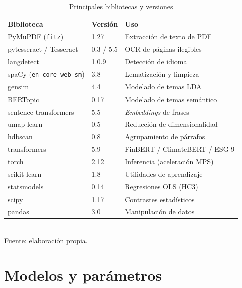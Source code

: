 \begin{table}[H]
\centering
\caption{Principales bibliotecas y versiones}
\label{tab:versiones}
\begin{tabular}{lll}
\toprule
\textbf{Biblioteca} & \textbf{Versión} & \textbf{Uso} \\
\midrule
PyMuPDF (\texttt{fitz}) & 1.27 & Extracción de texto de PDF \\
pytesseract / Tesseract & 0.3 / 5.5 & OCR de páginas ilegibles \\
langdetect & 1.0.9 & Detección de idioma \\
spaCy (\texttt{en\_core\_web\_sm}) & 3.8 & Lematización y limpieza \\
gensim & 4.4 & Modelado de temas LDA \\
BERTopic & 0.17 & Modelado de temas semántico \\
sentence-transformers & 5.5 & \textit{Embeddings} de frases \\
umap-learn & 0.5 & Reducción de dimensionalidad \\
hdbscan & 0.8 & Agrupamiento de párrafos \\
transformers & 5.9 & FinBERT / ClimateBERT / ESG-9 \\
torch & 2.12 & Inferencia (aceleración MPS) \\
scikit-learn & 1.8 & Utilidades de aprendizaje \\
statsmodels & 0.14 & Regresiones OLS (HC3) \\
scipy & 1.17 & Contrastes estadísticos \\
pandas & 3.0 & Manipulación de datos \\
\bottomrule
\end{tabular}
\\[4pt]
{\footnotesize Fuente: elaboración propia.}
\end{table}

\section*{Modelos y parámetros}

